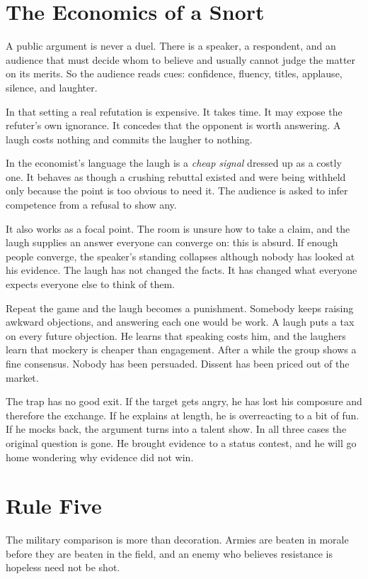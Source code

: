 \documentclass[12pt,a4paper]{book}
\begin{document}
\section{The Economics of a Snort}

A public argument is never a duel. There is a speaker, a respondent, and an audience that must decide whom to believe and usually cannot judge the matter on its merits. So the audience reads cues: confidence, fluency, titles, applause, silence, and laughter.

In that setting a real refutation is expensive. It takes time. It may expose the refuter's own ignorance. It concedes that the opponent is worth answering. A laugh costs nothing and commits the laugher to nothing.

In the economist's language the laugh is a \emph{cheap signal} dressed up as a costly one. It behaves as though a crushing rebuttal existed and were being withheld only because the point is too obvious to need it. The audience is asked to infer competence from a refusal to show any.

It also works as a focal point. The room is unsure how to take a claim, and the laugh supplies an answer everyone can converge on: this is absurd. If enough people converge, the speaker's standing collapses although nobody has looked at his evidence. The laugh has not changed the facts. It has changed what everyone expects everyone else to think of them.

Repeat the game and the laugh becomes a punishment. Somebody keeps raising awkward objections, and answering each one would be work. A laugh puts a tax on every future objection. He learns that speaking costs him, and the laughers learn that mockery is cheaper than engagement. After a while the group shows a fine consensus. Nobody has been persuaded. Dissent has been priced out of the market.

The trap has no good exit. If the target gets angry, he has lost his composure and therefore the exchange. If he explains at length, he is overreacting to a bit of fun. If he mocks back, the argument turns into a talent show. In all three cases the original question is gone. He brought evidence to a status contest, and he will go home wondering why evidence did not win.

\section{Rule Five}

The military comparison is more than decoration. Armies are beaten in morale before they are beaten in the field, and an enemy who believes resistance is hopeless need not be shot.
\end{document}
